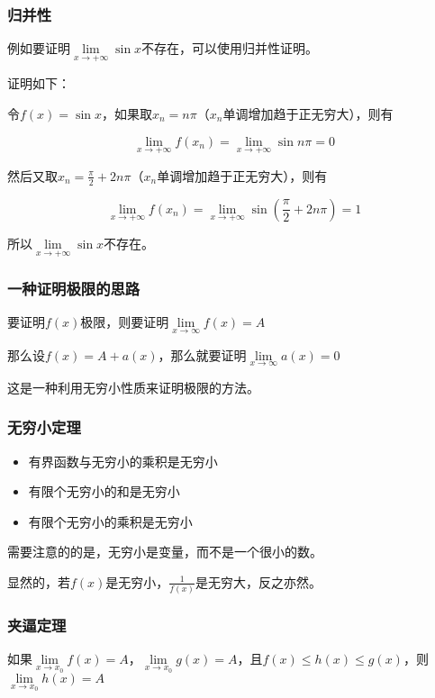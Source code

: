 \documentclass[12pt , a4paper , oneside]{ctexart}
\begin{document}
            \subsubsection{归并性}
            例如要证明$\lim\limits_{x \to + \infty} \sin x$不存在，可以使用归并性证明。

            \begin{mdframed}
            证明如下：

            令$f(x)=\sin x$，如果取$x_n=n\pi$（$x_n$单调增加趋于正无穷大），则有

            $$\lim\limits_{x \to + \infty} f(x_n) = \lim\limits_{x \to + \infty} \sin n\pi = 0$$

            然后又取$x_n=\frac{\pi}{2}+2n\pi$（$x_n$单调增加趋于正无穷大），则有

            $$\lim\limits_{x \to + \infty} f(x_n) = \lim\limits_{x \to + \infty} \sin (\frac{\pi}{2}+2n\pi) = 1$$
            
            所以$\lim\limits_{x \to + \infty} \sin x$不存在。
            \end{mdframed}

            \subsubsection{一种证明极限的思路}
            要证明$f(x)$极限，则要证明$\lim\limits_{x \to \infty} f(x) =A$

            那么设$f(x)=A+a(x)$，那么就要证明$\lim\limits_{x \to \infty} a(x) = 0$

            这是一种利用无穷小性质来证明极限的方法。

            \subsubsection{无穷小定理}
            \begin{itemize}
                \item 有界函数与无穷小的乘积是无穷小
                \item 有限个无穷小的和是无穷小
                \item 有限个无穷小的乘积是无穷小
            \end{itemize}
            需要注意的的是，无穷小是变量，而不是一个很小的数。

            显然的，若$f(x)$是无穷小，$\frac{1}{f(x)}$是无穷大，反之亦然。

            \subsubsection{夹逼定理}
            如果$\lim\limits_{x \to x_0} f(x) = A$，$\lim\limits_{x \to x_0} g(x) = A$，且$f(x) \leq h(x) \leq g(x)$，则$\lim\limits_{x \to x_0} h(x) = A$
\end{document}
